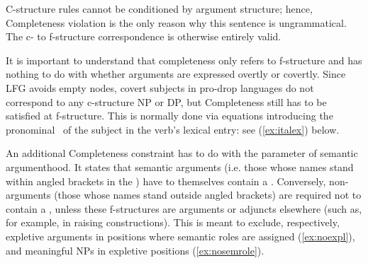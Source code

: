 \documentclass[output=paper,hidelinks]{langscibook}
\begin{document}
  \begin{exe}
 \ex \label{ex:compl-viol}
 \end{exe}
 
C-structure rules cannot be conditioned by argument structure; hence, Completeness violation is the only reason why this sentence is ungrammatical. The c- to f-structure correspondence is otherwise entirely valid.
 
 It is important to understand that completeness only refers to f-structure and has nothing to do with whether arguments are expressed overtly or covertly. Since LFG avoids empty nodes, covert subjects in pro-drop languages do not correspond to any c-structure NP or DP, but Completeness still has to be satisfied at f-structure. This is normally done via equations introducing the pronominal \PRED\ of the subject in the verb's lexical entry: see (\ref{ex:italex}) below.
 
 An additional Completeness constraint has to do with the parameter of semantic argumenthood. It states that semantic arguments (i.e. those whose names stand within angled brackets in the \PRED) have to themselves contain a \PRED. Conversely, non-arguments (those whose names stand outside angled brackets) are required not to contain a \PRED, unless these f-structures are arguments or adjuncts elsewhere (such as, for example, in raising constructions).  This is meant to exclude, respectively, expletive arguments in positions where semantic roles are assigned (\ref{ex:noexpl}), and meaningful NPs in expletive positions (\ref{ex:nosemrole}).
 
\end{document}
